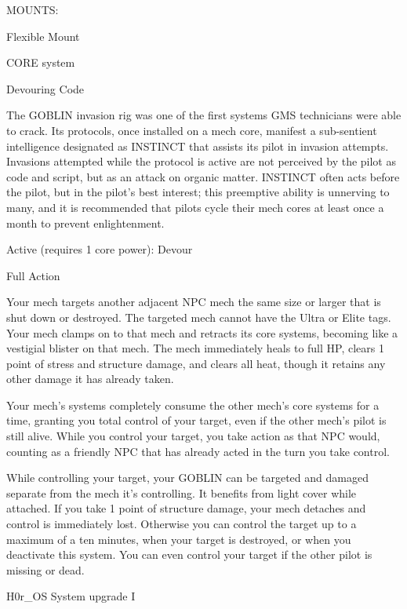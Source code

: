                                                   MOUNTS:

  Flexible Mount

                                                CORE system




                                                  Devouring Code

  The GOBLIN invasion rig was one of the first systems GMS technicians were able to crack. Its
  protocols, once installed on a mech core, manifest a sub-sentient intelligence designated as INSTINCT
  that assists its pilot in invasion attempts. Invasions attempted while the protocol is active are not
  perceived by the pilot as code and script, but as an attack on organic matter. INSTINCT often acts
  before the pilot, but in the pilot’s best interest; this preemptive ability is unnerving to many, and it is
  recommended that pilots cycle their mech cores at least once a month to prevent enlightenment.

  Active (requires 1 core power): Devour

  Full Action

  Your mech targets another adjacent NPC mech the same size or larger that is shut down or destroyed.
  The targeted mech cannot have the Ultra or Elite tags. Your mech clamps on to that mech and retracts
  its core systems, becoming like a vestigial blister on that mech. The mech immediately heals to full HP,
  clears 1 point of stress and structure damage, and clears all heat, though it retains any other damage it
  has already taken.


  Your mech’s systems completely consume the other mech’s core systems for a time, granting you total
  control of your target, even if the other mech’s pilot is still alive. While you control your target, you take
  action as that NPC would, counting as a friendly NPC that has already acted in the turn you take
  control.


  While controlling your target, your GOBLIN can be targeted and damaged separate from the mech it’s
  controlling. It benefits from light cover while attached. If you take 1 point of structure damage, your
  mech detaches and control is immediately lost. Otherwise you can control the target up to a maximum
  of a ten minutes, when your target is destroyed, or when you deactivate this system. You can even
  control your target if the other pilot is missing or dead.

H0r\_OS System upgrade I

